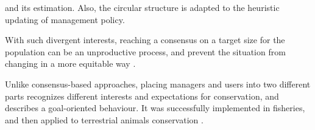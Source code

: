 \documentclass[12pt,a4paper]{article}
\begin{document}

and its estimation.
Also, the circular structure is adapted to the heuristic updating of management policy.

With such divergent interests, reaching a consensus on a target size for the population can be an unproductive process, and prevent the situation from changing in a more equitable way \citep{peterson2005conservation}. 


Unlike consensus-based approaches, placing managers and users into two different parts recognizes different interests and expectations for conservation, and describes a goal-oriented behaviour. %
It was successfully implemented in fisheries, and then applied to terrestrial animals conservation \citep{BUNNEFELD2011441, bunnefeld2013incentivizing}.
\end{document}
